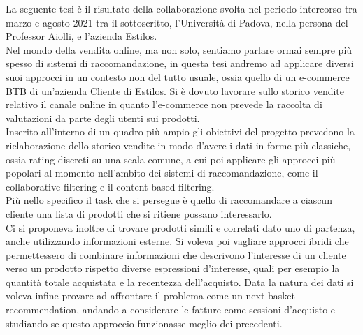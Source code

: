 
La seguente tesi è il risultato della collaborazione svolta nel periodo intercorso tra marzo e agosto 2021 tra il sottoscritto, l'Università di Padova, nella persona del Professor Aiolli, e l'azienda Estilos.\\
Nel mondo della vendita online, ma non solo, sentiamo parlare ormai sempre più spesso di sistemi di raccomandazione, in questa tesi andremo ad applicare diversi suoi approcci in un contesto non del tutto usuale, ossia quello di un e-commerce BTB di un'azienda Cliente di Estilos. 
Si è dovuto lavorare sullo storico vendite relativo il canale online in quanto l'e-commerce non prevede la raccolta di valutazioni da parte degli utenti sui prodotti.\\
Inserito all'interno di un quadro più ampio gli obiettivi del progetto prevedono la rielaborazione dello storico vendite in modo d'avere i dati in forme più classiche, ossia rating discreti su una scala comune, a cui poi applicare gli approcci più popolari al momento nell'ambito dei sistemi di raccomandazione, come il collaborative filtering e il content based filtering.\\
Più nello specifico il task che si persegue è quello di raccomandare a ciascun cliente una lista di prodotti che si ritiene possano interessarlo.\\
Ci si proponeva inoltre di trovare prodotti simili e correlati dato uno di partenza, anche utilizzando informazioni esterne. Si voleva poi vagliare approcci ibridi che permettessero di combinare informazioni che descrivono l'interesse di un cliente verso un prodotto rispetto diverse espressioni d'interesse, quali per esempio la quantità totale acquistata e la recentezza dell'acquisto. Data la natura dei dati si voleva infine provare ad affrontare il problema come un next basket recommendation, andando a considerare le fatture come sessioni d'acquisto e studiando se questo approccio funzionasse meglio dei precedenti.